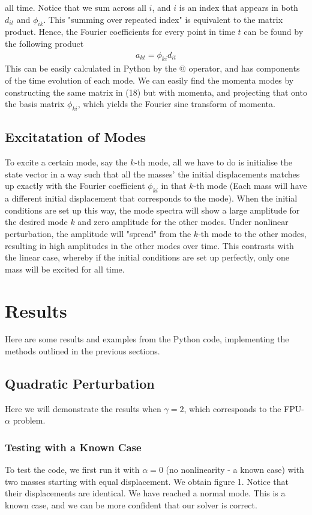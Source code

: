 \documentclass{article}
\begin{document}
all time. Notice that we sum across all $i$, and 
$i$ is an index that appears in both $d_{it}$ and $\phi_{ik}$. This "summing over repeated index"
is equivalent to the matrix product.
 Hence, the Fourier coefficients for every point in time $t$ can be found by 
the following product 
\begin{align}
    a_{kt}=\phi_{ki}d_{it}
\end{align}
This can be easily calculated in Python by the $@$ operator, and has components of the time 
evolution of each mode. We can easily find the momenta modes by constructing the same matrix 
in (18) but with momenta, and projecting that onto the basis matrix $\phi_{ki}$, which yields 
the Fourier sine transform of momenta.

\subsection{Excitatation of Modes}
To excite a certain mode, say the $k$-th mode, 
all we have to do is initialise the state vector 
in a way such that all the masses'
the initial displacements matches up
 exactly with the Fourier coefficient $\phi_{ki}$ in that $k$-th mode (Each mass
 will have a different initial displacement that corresponds to the mode). When the initial conditions are set up this way, the mode spectra 
will show a large amplitude for the desired mode $k$ and zero amplitude
 for the other modes.
Under nonlinear perturbation, 
the amplitude will "spread" from 
the $k$-th mode to the other modes, 
resulting in high amplitudes in the other modes over time. This contrasts with the linear case, 
whereby if the initial conditions are set up perfectly, 
only one mass will be excited for all time.
\section{Results}
Here are some results and examples from the Python code, implementing the methods outlined in the previous sections.
\subsection{Quadratic Perturbation}
Here we will demonstrate the results when $\gamma=2$, which corresponds to the FPU-$\alpha$ problem.
\subsubsection{Testing with a Known Case}
To test the code, we first run it with $\alpha=0$ (no nonlinearity - a known case) with two masses 
starting with equal displacement. We obtain figure 1.
Notice that their displacements are identical. We have reached a normal mode. This is 
a known case, and we can be more confident that our solver is correct.
\end{document}
